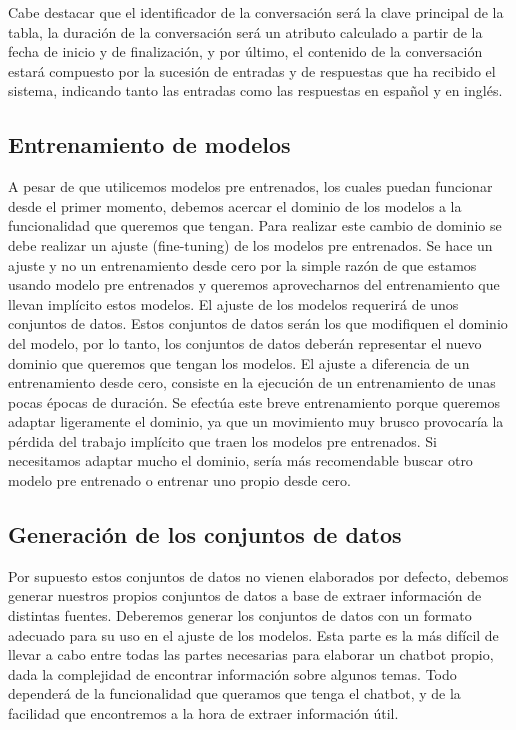 Cabe destacar que el identificador de la conversación será la clave principal de la tabla, la duración de la conversación será un atributo calculado a partir de la fecha de inicio y de finalización, y por último, el contenido de la conversación estará compuesto por la sucesión de entradas y de respuestas que ha recibido el sistema, indicando tanto las entradas como las respuestas en español y en inglés.

\subsection*{Entrenamiento de modelos}

A pesar de que utilicemos modelos pre entrenados, los cuales puedan funcionar desde el primer momento, debemos acercar el dominio de los modelos a la funcionalidad que queremos que tengan. Para realizar este cambio de dominio se debe realizar un ajuste (fine-tuning) de los modelos pre entrenados. Se hace un ajuste y no un entrenamiento desde cero por la simple razón de que estamos usando modelo pre entrenados y queremos aprovecharnos del entrenamiento que llevan implícito estos modelos. El ajuste de los modelos requerirá de unos conjuntos de datos. Estos conjuntos de datos serán los que modifiquen el dominio del modelo, por lo tanto, los conjuntos de datos deberán representar el nuevo dominio que queremos que tengan los modelos. El ajuste a diferencia de un entrenamiento desde cero, consiste en la ejecución de un entrenamiento de unas pocas épocas de duración. Se efectúa este breve entrenamiento porque queremos adaptar ligeramente el dominio, ya que un movimiento muy brusco provocaría la pérdida del trabajo implícito que traen los modelos pre entrenados. Si necesitamos adaptar mucho el dominio, sería más recomendable buscar otro modelo pre entrenado o entrenar uno propio desde cero.

\subsection*{Generación de los conjuntos de datos}

Por supuesto estos conjuntos de datos no vienen elaborados por defecto, debemos generar nuestros propios conjuntos de datos a base de extraer información de distintas fuentes. Deberemos generar los conjuntos de datos con un formato adecuado para su uso en el ajuste de los modelos. Esta parte es la más difícil de llevar a cabo entre todas las partes necesarias para elaborar un chatbot propio, dada la complejidad de encontrar información sobre algunos temas. Todo dependerá de la funcionalidad que queramos que tenga el chatbot, y de la facilidad que encontremos a la hora de extraer información útil.

